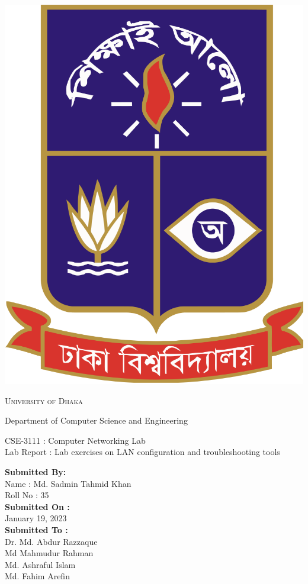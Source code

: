 \documentclass[11pt]{article}
\begin{document}
\begin{titlepage}
 \begin{center}
     \includegraphics[scale=0.10]{du.png}\par
  \begin{Huge}
   \textsc{University of Dhaka}\par
  \end{Huge}
  \begin{Large}
   Department of Computer Science and Engineering\par \vspace{1cm}
   CSE-3111 : Computer Networking Lab \\[13pt] 
   Lab Report : Lab exercises on LAN configuration and troubleshooting tools 
  \end{Large}
 \end{center}   
 \begin{large}
  \textbf{Submitted By:\\[12pt]}
   Name : Md. Sadmin Tahmid Khan\\[8pt]
   Roll No : 35\\[12pt]
  \textbf{Submitted On : \\[12pt]}
    January 19, 2023\\[20pt]
  \textbf{Submitted To :\\[12pt]}
   Dr. Md. Abdur Razzaque\\[12pt]
                Md Mahmudur Rahman\\[12pt]
                Md. Ashraful Islam\\[12pt]
                Md. Fahim Arefin
 \end{large}
\end{titlepage}
\end{document}
